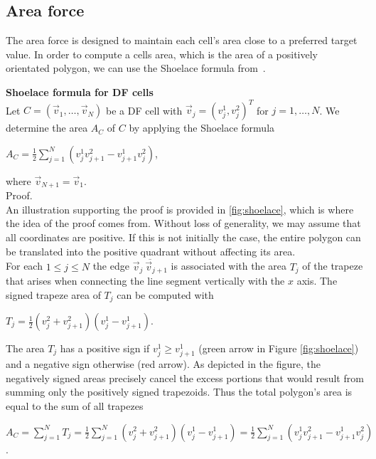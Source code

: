 \subsection{Area force}
The area force is designed to maintain each cell's area close to a preferred target value. 
In order to compute a cells area, which is the area of a positively orientated polygon, we can use the Shoelace formula from~\cite{Shoelace2014}. 

\begin{proposition}  \textbf{Shoelace formula for DF cells} \label{prop:Shoelace}\\ 
	Let $C = (\vec{v}_1, \ldots, \vec{v}_N)$ be a DF cell with $\vec{v}_j = (v_j^1, v_j^2)^T$ for $j=1,\ldots,N$.
	We determine the area $A_C$ of $C$ by applying the Shoelace formula
	\begin{center}
		$A_C = \frac{1}{2}\sum\limits_{j = 1}^{N} (v_j^1 v_{j+1}^2 - v_{j+1}^1 v_j^2)$,
	\end{center} 
	where $\vec{v}_{N + 1} = \vec{v}_1$. \\
	Proof. 	\\
	An illustration supporting the proof is provided in \ref{fig:shoelace}, which is where the idea of the proof comes from. 
	Without loss of generality, we may assume that all coordinates are positive.
	If this is not initially the case, the entire polygon can be translated into the positive quadrant without affecting its area. \\
	For each $1 \leq j \leq N$ the edge $\overline{ \vec{v}_j \: \vec{v}_{j+1}}$ is associated with the area $T_j$ of the trapeze that arises when connecting the line segment vertically with the $x$ axis. 
	The signed trapeze area of $T_j$ can be computed with 
	\begin{center}
		$T_j = \frac{1}{2} (v_j^2 + v_{j+1}^2)(v_j^1 - v_{j+1}^1)$.
	\end{center}
	The area $T_j$ has a positive sign if $v_j^1 \geq v_{j+1}^1$ (green arrow in Figure \ref{fig:shoelace}) and a negative sign otherwise (red arrow). 
	As depicted in the figure, the negatively signed areas precisely cancel the excess portions that would result from summing only the positively signed trapezoids.
	Thus the total polygon's area is equal to the sum of all trapezes
	\begin{center}
		$A_C = \sum\limits_{j = 1}^{N} T_j = \frac{1}{2} \sum\limits_{j = 1}^{N} (v_j^2 + v_{j+1}^2)(v_j^1 - v_{j+1}^1) = \frac{1}{2}\sum\limits_{j = 1}^{N} (v_j^1 v_{j+1}^2 - v_{j+1}^1 v_j^2) $.
	\end{center} 

\end{proposition}
